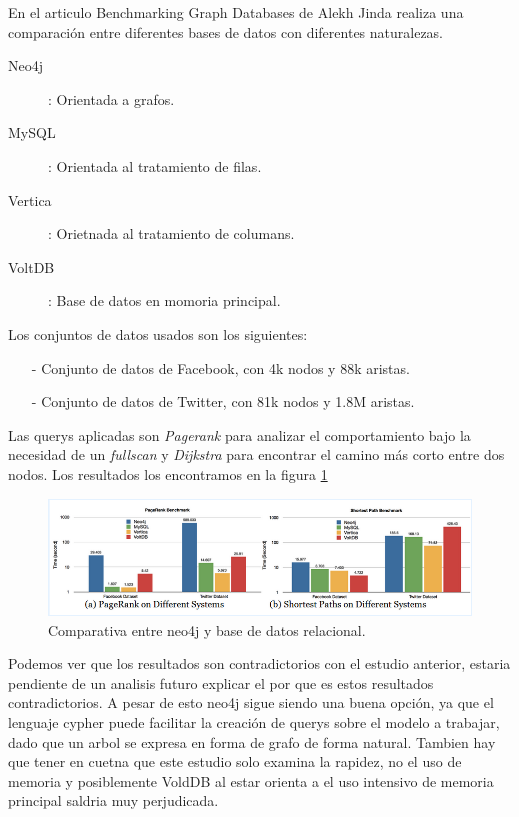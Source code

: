 \documentclass[12pt]{article} %
\begin{document}
En el articulo Benchmarking Graph Databases de Alekh Jinda \cite{graphvsrelational} realiza una comparación entre diferentes bases de datos con diferentes naturalezas.

\begin{description}
\item[Neo4j]: Orientada a grafos.
\item[MySQL]: Orientada al tratamiento de filas.
\item[Vertica]: Orietnada al tratamiento de columans.
\item[VoltDB]: Base de datos en momoria principal.
\end{description}

Los conjuntos de datos usados son los siguientes:
\begin{itemize}
\item[-] Conjunto de datos de Facebook, con 4k nodos y 88k aristas.
\item[-] Conjunto de datos de Twitter, con 81k nodos y 1.8M aristas.
\end{itemize}

Las querys aplicadas son \textit{Pagerank} para analizar el comportamiento bajo la necesidad de un \textit{fullscan} y \textit{Dijkstra} para encontrar el camino más corto entre dos nodos. Los resultados los encontramos en la figura \ref{fig:benchmarkingneo4j}

\begin{figure}[ht!]
\center
\includegraphics[scale=0.5]{benchmarkingneo4j.png}
\caption{Comparativa entre neo4j y base de datos relacional.}
\label{fig:benchmarkingneo4j}
\end{figure}

Podemos ver que los resultados son contradictorios con el estudio anterior, estaria pendiente de un analisis futuro explicar el por que es estos resultados contradictorios. A pesar de esto neo4j sigue siendo una buena opción, ya que el lenguaje cypher puede facilitar la creación de querys sobre el modelo a trabajar, dado que un arbol se expresa en forma de grafo de forma natural. Tambien hay que tener en cuetna que este estudio solo examina la rapidez, no el uso de memoria y posiblemente VoldDB al estar orienta a el uso intensivo de memoria principal saldria muy perjudicada.
\end{document}
